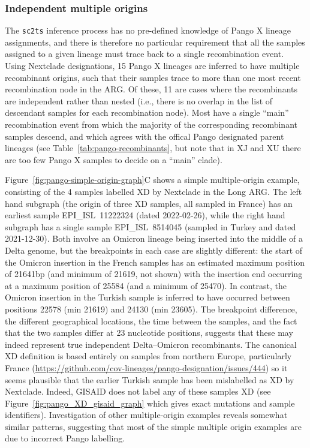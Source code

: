 \documentclass{article}
\begin{document}
\subsubsection{Independent multiple origins}
The \texttt{sc2ts} inference process has no pre-defined knowledge
of Pango X lineage assignments, and there is therefore no particular
requirement that all the samples assigned to a given lineage must trace back to
a single recombination event. Using Nextclade designations, 15 Pango X lineages are
inferred to have multiple
recombinant origins, such that their samples trace to more than one most recent
recombination node in the ARG. Of these, 11 are cases where the
recombinants are independent rather than nested (i.e., there is no overlap in the list
of descendant samples for each recombination node). Most have a single ``main''
recombination event from which the majority of the corresponding recombinant samples
descend, and which agrees with the offical Pango designated parent lineages
(see Table~\ref{tab:pango-recombinants}, but note that
in XJ and XU there are too few Pango X samples to decide on a ``main'' clade).

Figure~\ref{fig:pango-simple-origin-graph}C shows a simple multiple-origin example, consisting of
the 4 samples labelled XD by Nextclade in the Long ARG. The left hand subgraph
(the origin of three XD samples, all sampled in France) has an earliest
sample EPI\_ISL~11222324 (dated 2022-02-26), while the right hand
subgraph has a single sample EPI\_ISL~8514045 (sampled in Turkey and dated 2021-12-30).
Both involve an Omicron lineage being inserted into the middle of a Delta genome, but
the breakpoints in each case are slightly different: the start of the Omicron insertion
in the French samples has an estimated maximum position of 21641bp
(and minimum of 21619, not shown) with the insertion end occurring at a maximum position of 25584
(and a minimum of 25470). In contrast, the Omicron insertion in the Turkish sample
is inferred to have occurred between positions 22578 (min 21619) and 24130 (min 23605).
The breakpoint difference, the different geographical locations, the time between the
samples, and the fact that the two samples differ at 23 nucleotide positions,
suggests that these may indeed represent true independent Delta--Omicron recombinants.
The canonical XD definition is based entirely on samples from northern Europe, particularly
France (\url{https://github.com/cov-lineages/pango-designation/issues/444}) so it seems
plausible that the earlier Turkish sample has been mislabelled as XD by Nextclade.
Indeed, GISAID does not label any of these samples XD (see
Figure~\ref{fig:pango_XD_gisaid_graph} which gives exact mutations and sample identifiers).
Investigation of other multiple-origin examples reveals somewhat similar patterns,
suggesting that most of the simple multiple origin examples are due to incorrect
Pango labelling.
\end{document}
